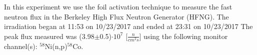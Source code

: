 In this experiment we use the foil activation technique to measure the fast neutron flux in the Berkeley High Flux Neutron Generator (HFNG).  The irradiation began at 11:53 on 10/23/2017 and ended at 23:31 on 10/23/2017  The peak flux measured was (3.98$\pm$0.5)$\cdot 10^7$ [$\frac{n}{cm^2s}$] using the following monitor channel(s): $^{58}$Ni(n,p)$^{58}$Co.
